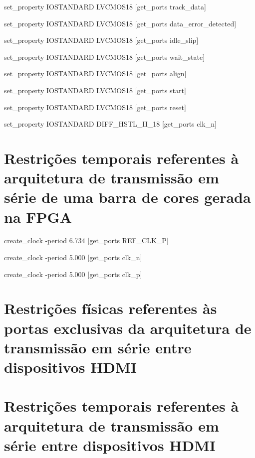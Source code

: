 set\_property IOSTANDARD LVCMOS18 [get\_ports track\_data]

set\_property IOSTANDARD LVCMOS18 [get\_ports data\_error\_detected]

set\_property IOSTANDARD LVCMOS18 [get\_ports idle\_slip]

set\_property IOSTANDARD LVCMOS18 [get\_ports wait\_state]

set\_property IOSTANDARD LVCMOS18 [get\_ports align]

set\_property IOSTANDARD LVCMOS18 [get\_ports start]

set\_property IOSTANDARD LVCMOS18 [get\_ports reset]

set\_property IOSTANDARD DIFF\_HSTL\_II\_18 [get\_ports clk\_n]

\section{Restrições temporais referentes à arquitetura de transmissão em série de uma barra de cores gerada na FPGA} \label{ap:temporais_planD}

create\_clock -period 6.734 [get\_ports REF\_CLK\_P]

create\_clock -period 5.000 [get\_ports clk\_n]

create\_clock -period 5.000 [get\_ports clk\_p]


\section{Restrições físicas referentes às portas exclusivas da arquitetura de transmissão em série entre dispositivos HDMI} \label{ap:fisicas_planE}

\section{Restrições temporais referentes à arquitetura de transmissão em série entre dispositivos HDMI} \label{ap:temporais_planE}
